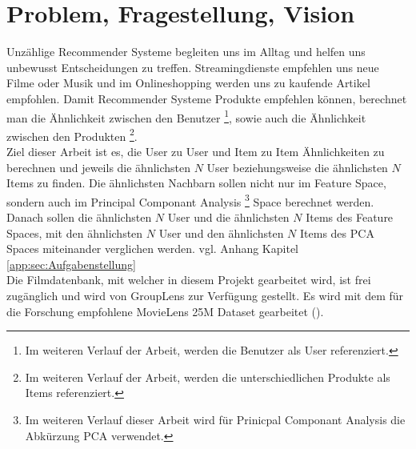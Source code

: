 \chapter{Problem, Fragestellung, Vision}
\label{ch:ProblemFragestellungVision}
Unzählige Recommender Systeme begleiten uns im Alltag und helfen uns unbewusst Entscheidungen zu treffen. Streamingdienste empfehlen uns neue Filme oder Musik und im Onlineshopping werden uns zu kaufende Artikel empfohlen. Damit Recommender Systeme Produkte empfehlen können, berechnet man die Ähnlichkeit zwischen den Benutzer \footnote{Im weiteren Verlauf der Arbeit, werden die Benutzer als User referenziert.}, sowie auch die Ähnlichkeit zwischen den Produkten \footnote{Im weiteren Verlauf der Arbeit, werden die unterschiedlichen Produkte als Items referenziert.}.\\

\noindent Ziel dieser Arbeit ist es, die User zu User und Item zu Item Ähnlichkeiten zu berechnen und jeweils die ähnlichsten $N$ User beziehungsweise die ähnlichsten $N$ Items zu finden.
Die ähnlichsten Nachbarn sollen nicht nur im Feature Space, sondern auch im Principal Componant Analysis \footnote{Im weiteren Verlauf dieser Arbeit wird für Prinicpal Componant Analysis die Abkürzung PCA verwendet.} Space berechnet werden. Danach sollen die ähnlichsten $N$ User und die ähnlichsten $N$ Items des Feature Spaces, mit den ähnlichsten $N$ User und den ähnlichsten $N$ Items des PCA Spaces miteinander verglichen werden. vgl. Anhang Kapitel \ref{app:sec:Aufgabenstellung} \\

\noindent Die Filmdatenbank, mit welcher in diesem Projekt gearbeitet wird, ist frei zugänglich und wird von GroupLens zur Verfügung gestellt. Es wird mit dem für die Forschung empfohlene MovieLens 25M Dataset gearbeitet (\cite{10.1145/2827872}).


